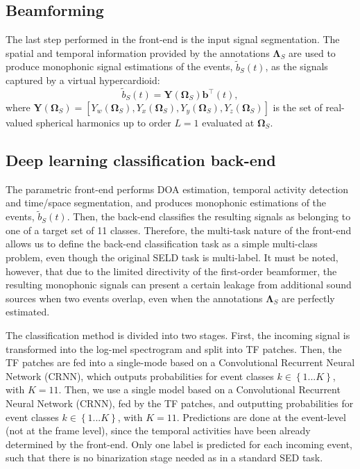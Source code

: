 \subsection{Beamforming}
\label{ssec:Beamforming}

The last step performed in the front-end is the input signal segmentation. The spatial and temporal information provided by the annotations $\pmb{\Lambda}_S$ are used to produce monophonic signal estimations of the events, $\tilde{b}_S(t)$, as the signals captured by a virtual hypercardioid:
\begin{equation}
\tilde{b}_S(t) = \pmb{Y}(\pmb{\Omega}_S) \pmb{b}^\intercal(t),
\end{equation}
where $ \pmb{Y}(\pmb{\Omega}_S) = [Y_w(\pmb{\Omega}_S), Y_x(\pmb{\Omega}_S), Y_y(\pmb{\Omega}_S), Y_z(\pmb{\Omega}_S)]$ is the set of real-valued spherical harmonics up to order $L=1$ evaluated at $\pmb{\Omega}_S$.



\subsection{Deep learning classification back-end}
\label{ssec:backend_method}

The parametric front-end performs DOA estimation, temporal activity detection and time/space segmentation, and produces monophonic estimations of the events, $\tilde{b}_S(t)$.
Then, the back-end classifies the resulting signals as belonging to one of a target set of 11 classes.
Therefore, the multi-task nature of the front-end allows us to define the back-end classification task as a simple multi-class problem, even though the original SELD task is multi-label.
It must be noted, however, that due to the limited directivity of the first-order beamformer, the resulting monophonic signals can present a certain leakage from additional sound sources when two events overlap, even when the annotations $\pmb{\Lambda}_S$ are perfectly estimated.

The classification method is divided into two stages.
First, the incoming signal is transformed into the log-mel spectrogram and split into TF patches.
Then, the TF patches are fed into a single-mode based on a Convolutional Recurrent Neural Network (CRNN), which outputs probabilities for event classes $k \in \left\lbrace 1 ... K \right\rbrace$, with $K=11$.
Then, we use a single model based on a Convolutional Recurrent Neural Network (CRNN), fed by the TF patches, and outputting probabilities for event classes $k \in \left\lbrace 1 ... K \right\rbrace$, with $K=11$.
Predictions are done at the event-level (not at the frame level), since the temporal activities have been already determined by the front-end.
Only one label is predicted for each incoming event, such that there is no binarization stage needed as in a standard SED task.

